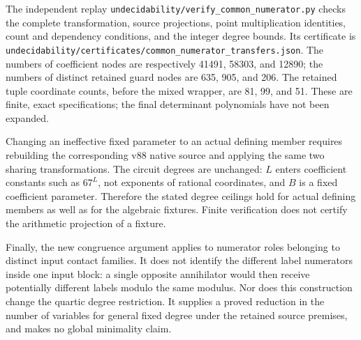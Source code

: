 \documentclass[11pt]{article}
\begin{document}
The independent replay
\nolinkurl{undecidability/verify_common_numerator.py}
checks the complete transformation, source projections,
point multiplication identities, count and dependency
conditions, and the integer degree bounds. Its certificate is
\nolinkurl{undecidability/certificates/common_numerator_transfers.json}.
The numbers of coefficient nodes are respectively
41491, 58303, and 12890; the numbers of distinct retained
guard nodes are 635, 905, and 206. The retained tuple
coordinate counts, before the mixed wrapper, are 81, 99,
and 51. These are finite, exact specifications; the final
determinant polynomials have not been expanded.

Changing an ineffective fixed parameter to an actual
defining member requires rebuilding the corresponding
v88 native source and applying the same two sharing
transformations. The circuit degrees are unchanged:
\(L\) enters coefficient constants such as \(67^L\), not
exponents of rational coordinates, and \(B\) is a fixed
coefficient parameter. Therefore the stated degree
ceilings hold for actual defining members as well as
for the algebraic fixtures. Finite verification does not
certify the arithmetic projection of a fixture.

Finally, the new congruence argument applies to numerator
roles belonging to distinct input contact families. It
does not identify the different label numerators inside
one input block: a single opposite annihilator would then
receive potentially different labels modulo the same
modulus. Nor does this construction change the quartic
degree restriction. It supplies a proved reduction in the
number of variables for general fixed degree under the
retained source premises, and makes no global minimality
claim.
\end{document}
